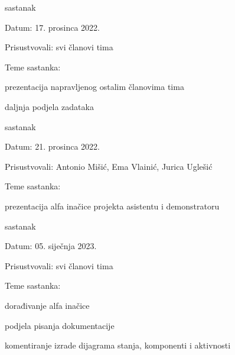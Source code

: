 \begin{packed_enum}
                \item  sastanak
			\item[] \begin{packed_item}
				\item Datum: 17. prosinca 2022.
				\item Prisustvovali: svi članovi tima
				\item Teme sastanka:
				\begin{packed_item} 
                        \item  prezentacija napravljenog ostalim članovima tima
                        \item daljnja podjela zadataka
                        
				\end{packed_item}
			\end{packed_item}

                \item  sastanak
			\item[] \begin{packed_item}
				\item Datum: 21. prosinca 2022.
				\item Prisustvovali: Antonio Mišić, Ema Vlainić, Jurica Uglešić
				\item Teme sastanka:
				\begin{packed_item} 
                        \item  prezentacija alfa inačice projekta asistentu i demonstratoru
				\end{packed_item}
			\end{packed_item}
   
                \item  sastanak
			\item[] \begin{packed_item}
				\item Datum: 05. siječnja 2023.
				\item Prisustvovali: svi članovi tima
				\item Teme sastanka:
				\begin{packed_item} 
                        \item  dorađivanje alfa inačice
                        \item  podjela pisanja dokumentacije
                        \item  komentiranje izrade dijagrama stanja, komponenti i aktivnosti
				\end{packed_item}
			\end{packed_item}


\end{packed_enum}
